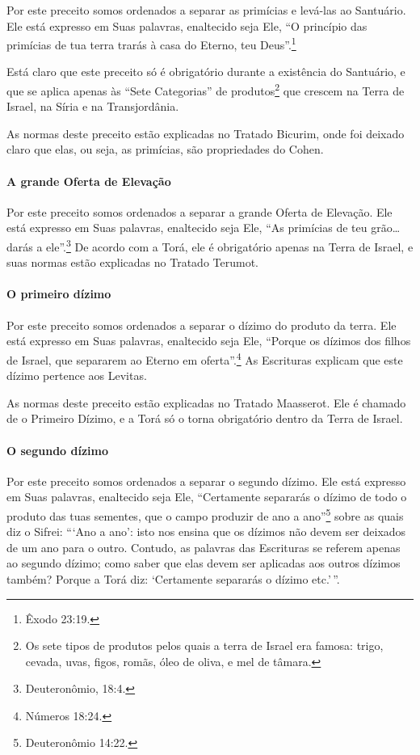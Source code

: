 Por este preceito somos ordenados a separar as primícias e levá-las ao
Santuário. Ele está expresso em Suas palavras, enaltecido seja Ele, ``O
princípio das primícias de tua terra trarás à casa do Eterno, teu
Deus''.\footnote{Êxodo 23:19.}

Está claro que este preceito só é obrigatório durante a existência do
Santuário, e que se aplica apenas às ``Sete Categorias'' de
produtos\footnote{Os sete tipos de produtos pelos quais a terra de Israel era famosa:
  trigo, cevada, uvas, figos, romãs, óleo de oliva, e mel de tâmara.} que crescem na Terra de Israel, na Síria
e na Transjordânia.

As normas deste preceito estão explicadas no Tratado Bicurim, onde foi deixado claro que elas, ou seja, as primícias, são propriedades do Cohen.

\paragraph{A grande Oferta de Elevação}

Por este preceito somos ordenados a separar a grande Oferta de
Elevação. Ele está expresso em Suas palavras, enaltecido seja Ele, ``As
primícias de teu grão\ldots{} darás a ele''.\footnote{Deuteronômio, 18:4.} De acordo
com a Torá, ele é obrigatório apenas na Terra de Israel, e suas normas
estão explicadas no Tratado Terumot.

\paragraph{O primeiro dízimo}

Por este preceito somos ordenados a separar o dízimo do produto da
terra. Ele está expresso em Suas palavras, enaltecido seja Ele, ``Porque
os dízimos dos filhos de Israel, que separarem ao Eterno em oferta''.\footnote{Números 18:24.} As Escrituras explicam que este dízimo pertence aos
Levitas.

As normas deste preceito estão explicadas no Tratado Maasserot. Ele é
chamado de o Primeiro Dízimo, e a Torá só o torna obrigatório dentro da
Terra de Israel.

\paragraph{O segundo dízimo}

Por este preceito somos ordenados a separar o segundo dízimo. Ele está
expresso em Suas palavras, enaltecido seja Ele, ``Certamente separarás o
dízimo de todo o produto das tuas sementes, que o campo produzir de ano
a ano''\footnote{Deuteronômio 14:22.} sobre as quais diz o Sifrei: ```Ano a ano':
isto nos ensina que os dízimos não devem ser deixados de um ano para o
outro. Contudo, as palavras das Escrituras se referem apenas ao segundo
dízimo; como saber que elas devem ser aplicadas aos outros dízimos
também? Porque a Torá diz: `Certamente separarás o dízimo etc.'\,''.

